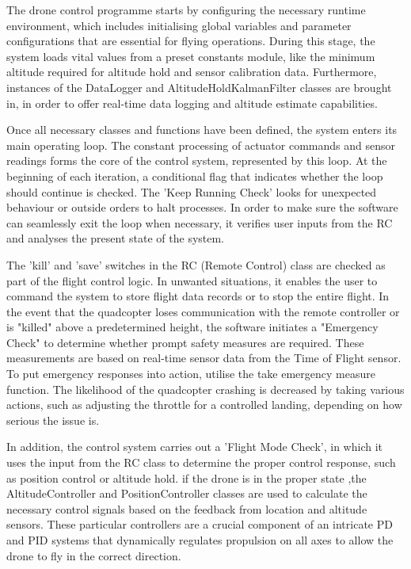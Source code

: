 \documentclass{article}
\begin{document}
The drone control programme starts by configuring the necessary runtime
environment, which includes initialising global variables and parameter
configurations that are essential for flying operations. During this stage, the
system loads vital values from a preset constants module, like the minimum
altitude required for altitude hold and sensor calibration data. Furthermore,
instances of the DataLogger and AltitudeHoldKalmanFilter classes are brought
in, in order to offer real-time data logging and altitude estimate
capabilities.

Once all necessary classes and functions have been defined, the system enters
its main operating loop. The constant processing of actuator commands and sensor
readings forms the core of the control system, represented by this loop. At the
beginning of each iteration, a conditional flag that indicates whether the loop
should continue is checked. The 'Keep Running Check' looks for unexpected
behaviour or outside orders to halt processes. In order to make sure the
software can seamlessly exit the loop when necessary, it verifies user inputs
from the RC and analyses the present state of the system.

The 'kill' and 'save' switches in the RC (Remote Control) class are checked as
part of the flight control logic. In unwanted situations, it enables the user to
command the system to store flight data records or to stop the entire flight. In
the event that the quadcopter loses communication with the remote controller or
is "killed" above a predetermined height, the software initiates a "Emergency
Check" to determine whether prompt safety measures are required. These
measurements are based on real-time sensor data from the Time of Flight sensor.
To put emergency responses into action, utilise the take emergency measure
function. The likelihood of the quadcopter crashing is decreased by taking
various actions, such as adjusting the throttle for a controlled landing,
depending on how serious the issue is.

In addition, the control system carries out a 'Flight Mode Check', in which it
uses the input from the RC class to determine the proper control response, such
as position control or altitude hold. if the drone is in the proper state ,the
AltitudeController and PositionController classes are used to calculate the
necessary control signals based on the feedback from location and altitude
sensors. These particular controllers are a crucial component of an intricate PD
and PID systems that dynamically regulates propulsion on all axes to allow the
drone to fly in the correct direction.
\end{document}
